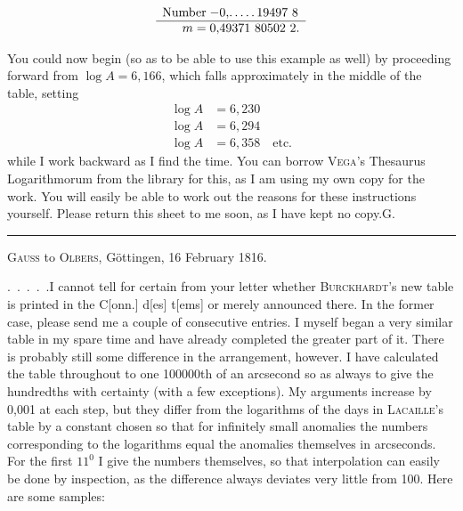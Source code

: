 \[
\begin{array}{r@{\;}l}
\text{Number}&-0{,}.\,.\,.\,.\,.\,19497\ 8\\\hline
m=&0{,}49371\ 80502\ 2.
\end{array}
\]
\par
\noindent\hspace*{\parindent}You could now begin (so as to be able to use this example as well) by proceeding forward from \(\log A=6{,}166\), which falls approximately in the middle of the table, setting
\[
\begin{aligned}
\log A&=6{,}230\\
\log A&=6{,}294\\
\log A&=6{,}358\quad\text{etc.}
\end{aligned}
\]
while I work backward as I find the time. You can borrow \textsc{Vega}'s Thesaurus Logarithmorum from the library for this, as I am using my own copy for the work. You will easily be able to work out the reasons for these instructions yourself. Please return this sheet to me soon, as I have kept no copy.\hfill G.
\par\medskip
\begin{center}\rule{.22\textwidth}{.4pt}\end{center}
\begin{center}\textsc{Gauss} to \textsc{Olbers}, Göttingen, 16 February 1816.\end{center}
\noindent\hspace*{\parindent}.\ .\ .\ .\ .\quad I cannot tell for certain from your letter whether \textsc{Burckhardt}'s new table is printed in the C[onn.] d[es] t[ems] or merely announced there. In the former case, please send me a couple of consecutive entries. I myself began a very similar table in my spare time and have already completed the greater part of it. There is probably still some difference in the arrangement, however. I have calculated the table throughout to one 100000th of an arcsecond so as always to give the hundredths with certainty (with a few exceptions). My arguments increase by 0,001 at each step, but they differ from the logarithms of the days in \textsc{Lacaille}'s table by a constant chosen so that for infinitely small anomalies the numbers corresponding to the logarithms equal the anomalies themselves in arcseconds. For the first \(11^0\) I give the numbers themselves, so that interpolation can easily be done by inspection, as the difference always deviates very little from 100. Here are some samples\unskip\nobreak\HistoricalNoteEight{\textsc{Gauss} gives three samples, of which only the first is printed here.]}:

